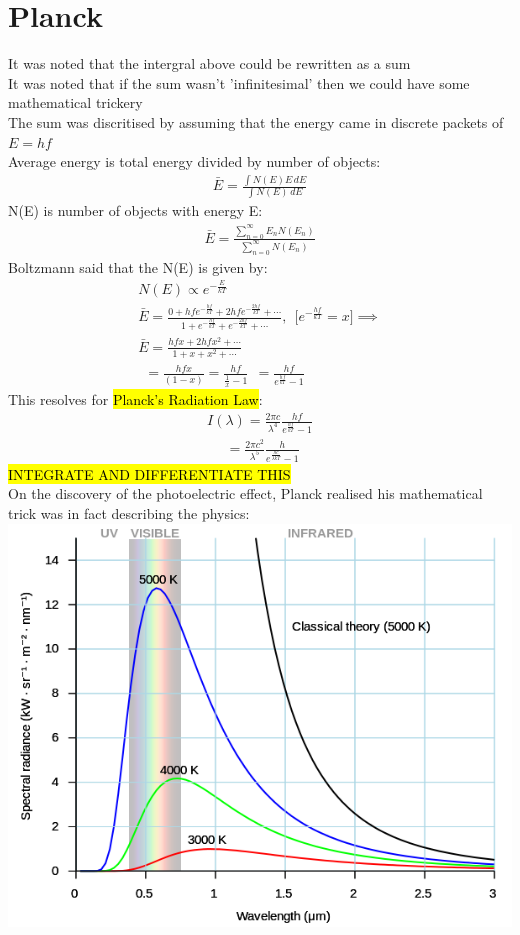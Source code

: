 \documentclass[a4paper, 11pt, fleqn, normalem]{report}
\begin{document}
\section{Planck}
It was noted that the intergral above could be rewritten as a sum \\
It was noted that if the sum wasn't 'infinitesimal' then we could have some mathematical trickery \\
The sum was discritised by assuming that the energy came in discrete packets of $E = hf$ \\
Average energy is total energy divided by number of objects:
\begin{gather*}
    \bar{E} = \frac{\int N(E)E\,dE}{\int N(E)\,dE}
\end{gather*}
N(E) is number of objects with energy E:
\begin{gather*}
    \bar{E} = \frac{\sum_{n = 0}^{\infty} E_{n} N(E_{n})}{\sum_{n=0}^{\infty} N(E_{n})}
\end{gather*}
Boltzmann said that the N(E) is given by:
\begin{gather*}
    N(E) \propto e^{-\tfrac{E}{kT}} \\
    \bar{E} = \frac{0 + hfe^{-\tfrac{hf}{kT}} + 2hfe^{-\tfrac{2hf}{kT}} + \cdots}{1 + e^{-\tfrac{hf}{kT}} + e^{-\tfrac{2hf}{kT}} + \cdots},~~\Big[e^{-\tfrac{hf}{kT}} = x\Big] \implies \\
    \bar{E} = \frac{hfx + 2hfx^{2} + \cdots}{1 + x + x^{2} + \cdots} \\
    ~~ = \frac{hfx}{(1-x)} = \frac{hf}{\tfrac{1}{x} - 1}
    ~~ = \frac{hf}{e^{\tfrac{hf}{kT}} - 1}
\end{gather*}
This resolves for \hl{Planck's Radiation Law}:
\begin{gather*}
    I(\lambda) = \frac{2\pi c}{\lambda^{4}} \frac{hf}{e^{\tfrac{hf}{kT}} - 1} \\
    ~~~~~~ = \frac{2\pi c^{2}}{\lambda^{5}} \frac{h}{e^{\tfrac{hc}{\lambda kT}} - 1}
\end{gather*}
\hl{INTEGRATE AND DIFFERENTIATE THIS} \\
On the discovery of the photoelectric effect, Planck realised his mathematical trick was in fact describing the physics: \\
\includegraphics[scale=0.5]{Planck.png}
\end{document}
